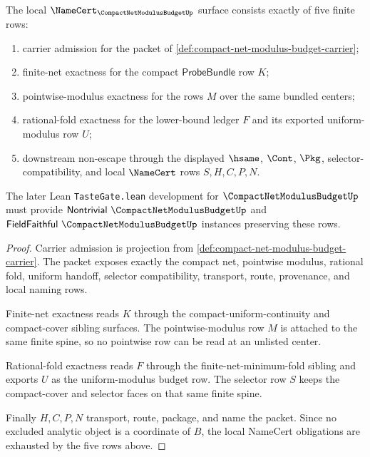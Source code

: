\begin{theorem}
\label{thm:compact-net-modulus-budget-namecert-obligations}
The local $\NameCert_{\CompactNetModulusBudgetUp}$ surface consists exactly of five finite rows:
\begin{enumerate}
\item carrier admission for the packet of \autoref{def:compact-net-modulus-budget-carrier};
\item finite-net exactness for the compact $\mathsf{ProbeBundle}$ row $K$;
\item pointwise-modulus exactness for the rows $M$ over the same bundled centers;
\item rational-fold exactness for the lower-bound ledger $F$ and its exported uniform-modulus row $U$;
\item downstream non-escape through the displayed $\hsame$, $\Cont$, $\Pkg$, selector-compatibility, and local $\NameCert$ rows $S,H,C,P,N$.
\end{enumerate}
The later Lean \texttt{TasteGate.lean} development for $\CompactNetModulusBudgetUp$ must provide $\mathsf{Nontrivial}\ \CompactNetModulusBudgetUp$ and $\mathsf{FieldFaithful}\ \CompactNetModulusBudgetUp$ instances preserving these rows.
\end{theorem}
\begin{proof}
Carrier admission is projection from \autoref{def:compact-net-modulus-budget-carrier}. The packet exposes exactly the compact net, pointwise modulus, rational fold, uniform handoff, selector compatibility, transport, route, provenance, and local naming rows.

Finite-net exactness reads $K$ through the compact-uniform-continuity and compact-cover sibling surfaces. The pointwise-modulus row $M$ is attached to the same finite spine, so no pointwise row can be read at an unlisted center.

Rational-fold exactness reads $F$ through the finite-net-minimum-fold sibling and exports $U$ as the uniform-modulus budget row. The selector row $S$ keeps the compact-cover and selector faces on that same finite spine.

Finally $H,C,P,N$ transport, route, package, and name the packet. Since no excluded analytic object is a coordinate of $B$, the local NameCert obligations are exhausted by the five rows above.
\end{proof}

